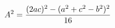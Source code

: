 \documentclass[preview]{standalone}
\begin{document}
\begin{align*}
\special{dvisvgm:raw <g id='unique000'>}A^2 = \frac{(2ac)^2 - (a^2 + c^2 - b^2)^2}{16}\special{dvisvgm:raw </g>}
\end{align*}
\end{document}
